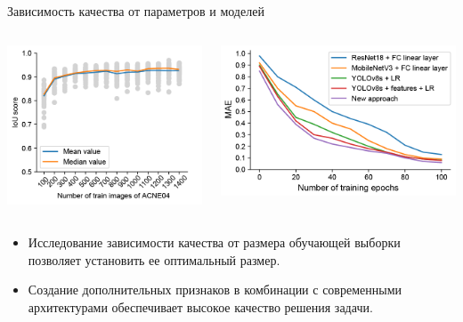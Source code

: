 \documentclass[12pt,pdf,hyperref={unicode}]{beamer}
\begin{document}
\begin{frame}{Зависимость качества от параметров и моделей}
\begin{columns}
\begin{column}{0.5\textwidth}
    \includegraphics[width=1\textwidth]{Holicheva-Step-10-fig-1}
\end{column}
\begin{column}{0.5\textwidth}
	\includegraphics[width=1\textwidth]{Holicheva-Step-10-fig-2}      
\end{column}
\end{columns}
\begin{itemize}
    \item Исследование зависимости качества от размера обучающей выборки позволяет установить ее оптимальный размер.
    \item Создание дополнительных признаков в комбинации с современными архитектурами обеспечивает высокое качество решения задачи.
\end{itemize}
\end{frame}
\end{document}
